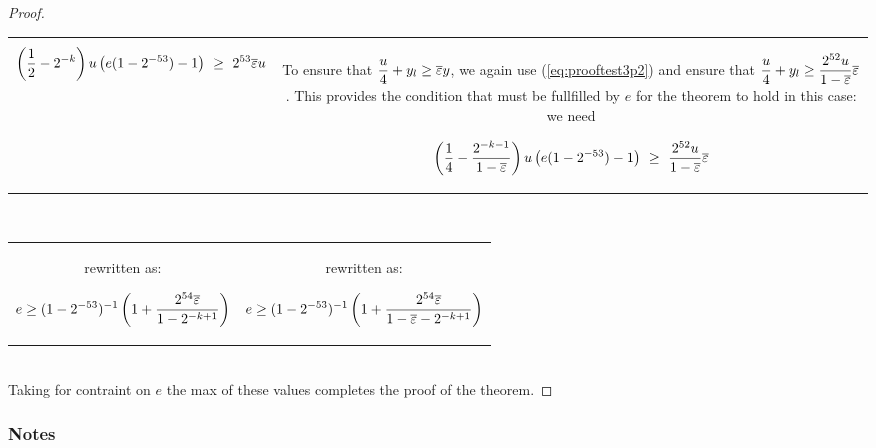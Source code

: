 \begin{proof}
\begin{tabular}{c||c}
\begin{minipage}[t]{7.5cm}
$$\left(\frac{1}{2} - 2^{-k}\right)u \left(e(1-2^{-53}) -1\right)
\ \ge \ 2^{53} {\overline{\varepsilon}} u $$
    \end{minipage}
  &
  \begin{minipage}[t]{7.5cm}
      To ensure that $\dfrac{u}{4} + y_l \ge {\overline{\varepsilon}} y$, we 
      again use (\ref{eq:prooftest3p2}) and ensure that $\dfrac{u}{4} + y_l \ge
      \dfrac{2^{52}u}{1-{\overline{\varepsilon}}}  {\overline{\varepsilon}} $. This provides the condition that must be
      fullfilled by $e$ for the theorem to hold in this case: we need

$$\left(\frac{1}{4} - \frac{2^{-k-1}}{1-{\overline{\varepsilon}}} \right)u \left(e(1-2^{-53}) -1\right)
\ \ge \ \dfrac{2^{52}u}{1-{\overline{\varepsilon}}}  {\overline{\varepsilon}} $$
  \end{minipage}
\end{tabular}\\  
\begin{tabular}{c||c}
    \begin{minipage}[t]{7.5cm}
  rewritten as:

  $$  e\ge 
   (1-2^{-53})^{-1}\left(
     1+ \dfrac{2^{54}{\overline{\varepsilon}}}{1 - 2^{-k+1}}
     \right)   $$
    \end{minipage}
  &
  \begin{minipage}[t]{7.5cm}
  rewritten as:

  $$  e\ge 
   (1-2^{-53})^{-1}\left(
     1+ \dfrac{2^{54}{\overline{\varepsilon}}}{1 - {\overline{\varepsilon}} - 2^{-k+1}}
     \right)   $$
  \end{minipage}
  \\
\end{tabular}\\

Taking for contraint on $e$ the max of these values completes the proof of the theorem.

\end{proof}


\subsubsection*{Notes}

